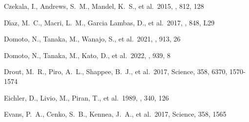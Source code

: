 \documentclass[twocolumn,twocolappendix]{aastex63}
\begin{document}
\begin{thebibliography}{}
 Czekala, I., Andrews, S.~M., Mandel, K.~S., et al.\ 2015, \apj, 812, 128




 D{\'\i}az, M.~C., Macri, L.~M., Garcia Lambas, D., et al.\ 2017, \apjl, 848, L29




 Domoto, N., Tanaka, M., Wanajo, S., et al.\ 2021, \apj, 913, 26


 Domoto, N., Tanaka, M., Kato, D., et al.\ 2022, \apj, 939, 8



 Drout, M.~R., Piro, A.~L., Shappee, B.~J., et al.\ 2017, Science, 358, 6370, 1570-1574




 Eichler, D., Livio, M., Piran, T., et al.\ 1989, \nat, 340, 126








 Evans, P.~A., Cenko, S.~B., Kennea, J.~A., et al.\ 2017, Science, 358, 1565









\end{thebibliography}
\end{document}
